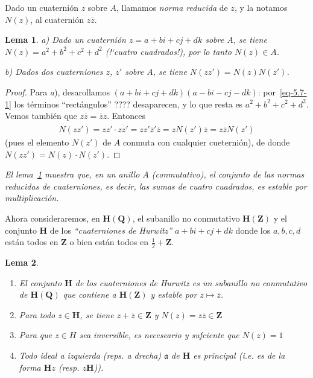 \documentclass[oneside,bibtotoc,leqno,spanish]{amsbook}
\newcommand{\QQ}{\mathbf{Q}}
\newcommand{\ZZ}{\mathbf{Z}}
\newcommand{\HH}{\mathbf{H}}
\newcommand{\idl}[1]{\mathfrak{#1}}
\newcommand{\QED}{}%
\newcommand{\oline}[1]{\overline{#1}}
\numberwithin{equation}{section}
\newenvironment{comm}%
	{\begin{trivlist}\item\small\itshape}
	{\end{trivlist}}
\theoremstyle{defi}
\theoremstyle{note}
\newtheorem{lemma}{Lema}
\theoremstyle{rem}
\numberwithin{theorem}{section}
\numberwithin{proposition}{section}
\numberwithin{definition}{section}
\numberwithin{lemma}{section}
\numberwithin{corollary}{section}
\numberwithin{example}{section}
\numberwithin{footnote}{section}%
\begin{document}
Dado un cuaterni\'on $z$ sobre $A$, llamamos {\em norma reducida} de $z$, y la notamos
$N(z)$, al cuaterni\'on $z\oline z$.

\begin{lemma}\label{lem5.7.2}
a) Dado un cuaterni\'on $z = a+bi+cj+dk$ sobre $A$, se tiene
$N(z) = a^{2}+b^{2}+c^{2}+d^{2}$ (!`cuatro cuadrados!), por lo tanto $N(z)\in A$.

b) Dados dos cuaterniones $z$, $z'$ sobre $A$, se tiene $N(zz') = N(z)N(z')$.
\end{lemma}

\begin{proof}
Para {\itshape a}), desarollamos $(a+bi+cj+dk)(a-bi-cj-dk)$: por~\eqref{eq-5.7-1} los t\'erminos
``rect\'angulos'' ???? desaparecen, y lo que resta es $a^{2}+b^{2}+c^{2}+d^{2}$. Vemos tambi\'en que
$z\oline z = \oline z z$. Entonces
\begin{gather*}
N(zz') = zz'\cdot\oline{zz'} = zz'\oline z'\oline z = zN(z')\oline z = z\oline zN(z')
\end{gather*}
(pues el elemento $N(z')$ de $A$ conmuta con cualquier cueterni\'on), de donde $N(zz') = N(z)\cdot N(z')$. \QED
\end{proof}

\begin{comm}
El lema~\ref{lem5.7.2} muestra que, en un anillo $A$ (conmutativo), el conjunto de las normas reducidas de cuaterniones,
es decir, las sumas de cuatro cuadrados, es estable por multiplicaci\'on.
\end{comm}

Ahora consideraremos, en $\HH(\QQ)$, el subanillo no conmutativo $\HH(\ZZ)$ y el conjunto $\HH$ de los
{\em ``cuaterniones de Hurwitz''} $a+bi+cj+dk$ donde los $a, b, c, d$ est\'an todos en $\ZZ$ o
bien est\'an todos en $\frac{1}{2}+\ZZ$.

\begin{lemma}
\begin{enumerate}
\item El conjunto $\HH$ de los cuaterniones de Hurwitz es un subanillo no conmutativo de $\HH(\QQ)$ que
contiene a $\HH(\ZZ)$ y estable por $z\mapsto\oline z$.
\item Para todo $z\in\HH$, se tiene $z+\oline z\in\ZZ$ y $N(z) = z\oline z\in\ZZ$
\item Para que $z\in H$ sea inversible, es neceseario y sufciente que $N(z) = 1$
\item Todo ideal a izquierda (reps. a drecha) $\idl{a}$ de $\HH$ es principal (i.e. es de la forma
$\HH z$ (resp. $z\HH$)).
\end{enumerate}
\end{lemma}
\end{document}
